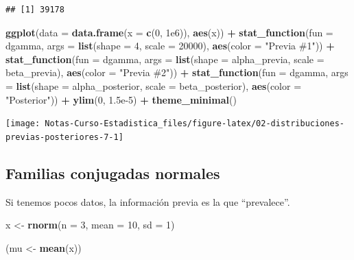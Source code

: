 \documentclass[
  12pt,
]{book}
\newenvironment{Shaded}{\begin{snugshade}}{\end{snugshade}}
\newcommand{\DataTypeTok}[1]{\textcolor[rgb]{0.13,0.29,0.53}{#1}}
\newcommand{\DecValTok}[1]{\textcolor[rgb]{0.00,0.00,0.81}{#1}}
\newcommand{\FloatTok}[1]{\textcolor[rgb]{0.00,0.00,0.81}{#1}}
\newcommand{\KeywordTok}[1]{\textcolor[rgb]{0.13,0.29,0.53}{\textbf{#1}}}
\newcommand{\NormalTok}[1]{#1}
\newcommand{\OperatorTok}[1]{\textcolor[rgb]{0.81,0.36,0.00}{\textbf{#1}}}
\newcommand{\StringTok}[1]{\textcolor[rgb]{0.31,0.60,0.02}{#1}}
\begin{document}
\begin{verbatim}
## [1] 39178
\end{verbatim}

\begin{Shaded}
\begin{Highlighting}[]
\KeywordTok{ggplot}\NormalTok{(}\DataTypeTok{data =} \KeywordTok{data.frame}\NormalTok{(}\DataTypeTok{x =} \KeywordTok{c}\NormalTok{(}\DecValTok{0}\NormalTok{, }\FloatTok{1e6}\NormalTok{)), }\KeywordTok{aes}\NormalTok{(x)) }\OperatorTok{+}
\StringTok{  }\KeywordTok{stat\_function}\NormalTok{(}\DataTypeTok{fun =}\NormalTok{ dgamma, }\DataTypeTok{args =} \KeywordTok{list}\NormalTok{(}\DataTypeTok{shape =} \DecValTok{4}\NormalTok{, }\DataTypeTok{scale =} \DecValTok{20000}\NormalTok{), }\KeywordTok{aes}\NormalTok{(}\DataTypeTok{color =} \StringTok{"Previa \#1"}\NormalTok{)) }\OperatorTok{+}
\StringTok{  }\KeywordTok{stat\_function}\NormalTok{(}\DataTypeTok{fun =}\NormalTok{ dgamma, }\DataTypeTok{args =} \KeywordTok{list}\NormalTok{(}\DataTypeTok{shape =}\NormalTok{ alpha\_previa, }\DataTypeTok{scale =}\NormalTok{ beta\_previa), }\KeywordTok{aes}\NormalTok{(}\DataTypeTok{color =} \StringTok{"Previa \#2"}\NormalTok{)) }\OperatorTok{+}
\StringTok{  }\KeywordTok{stat\_function}\NormalTok{(}\DataTypeTok{fun =}\NormalTok{ dgamma, }\DataTypeTok{args =} \KeywordTok{list}\NormalTok{(}\DataTypeTok{shape =}\NormalTok{ alpha\_posterior, }\DataTypeTok{scale =}\NormalTok{ beta\_posterior), }\KeywordTok{aes}\NormalTok{(}\DataTypeTok{color =} \StringTok{"Posterior"}\NormalTok{)) }\OperatorTok{+}
\StringTok{  }\KeywordTok{ylim}\NormalTok{(}\DecValTok{0}\NormalTok{, }\FloatTok{1.5e{-}5}\NormalTok{) }\OperatorTok{+}
\StringTok{  }\KeywordTok{theme\_minimal}\NormalTok{()}
\end{Highlighting}
\end{Shaded}

\begin{center}\texttt{[image: Notas-Curso-Estadistica\_files/figure-latex/02-distribuciones-previas-posteriores-7-1]} \end{center}

\hypertarget{familias-conjugadas-normales}{%
\subsection{Familias conjugadas normales}\label{familias-conjugadas-normales}}

Si tenemos pocos datos, la información previa es la que ``prevalece''.

\begin{Shaded}
\begin{Highlighting}[]
\NormalTok{x \textless{}{-}}\StringTok{ }\KeywordTok{rnorm}\NormalTok{(}\DataTypeTok{n =} \DecValTok{3}\NormalTok{, }\DataTypeTok{mean =} \DecValTok{10}\NormalTok{, }\DataTypeTok{sd =} \DecValTok{1}\NormalTok{)}

\NormalTok{(mu \textless{}{-}}\StringTok{ }\KeywordTok{mean}\NormalTok{(x))}
\end{Highlighting}
\end{Shaded}
\end{document}
